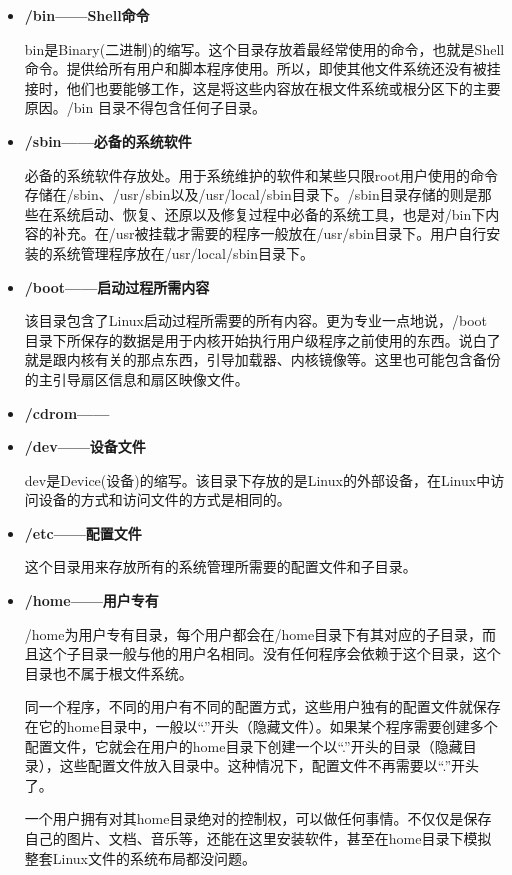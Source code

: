 \begin{itemize}
\item \textbf{/bin——Shell命令}

\qquad bin是Binary(二进制)的缩写。这个目录存放着最经常使用的命令，也就是Shell命令。提供给所有用户和脚本程序使用。所以，即使其他文件系统还没有被挂接时，他们也要能够工作，这是将这些内容放在根文件系统或根分区下的主要原因。/bin 目录不得包含任何子目录。

\item \textbf{/sbin——必备的系统软件}

\qquad 必备的系统软件存放处。用于系统维护的软件和某些只限root用户使用的命令存储在/sbin、/usr/sbin以及/usr/local/sbin目录下。/sbin目录存储的则是那些在系统启动、恢复、还原以及修复过程中必备的系统工具，也是对/bin下内容的补充。在/usr被挂载才需要的程序一般放在/usr/sbin目录下。用户自行安装的系统管理程序放在/usr/local/sbin目录下。

\item \textbf{/boot——启动过程所需内容}

\qquad 该目录包含了Linux启动过程所需要的所有内容。更为专业一点地说，/boot 目录下所保存的数据是用于内核开始执行用户级程序之前使用的东西。说白了就是跟内核有关的那点东西，引导加载器、内核镜像等。这里也可能包含备份的主引导扇区信息和扇区映像文件。

\item \textbf{/cdrom——}

\item \textbf{/dev——设备文件}

\qquad dev是Device(设备)的缩写。该目录下存放的是Linux的外部设备，在Linux中访问设备的方式和访问文件的方式是相同的。

\item \textbf{/etc——配置文件}

\qquad 这个目录用来存放所有的系统管理所需要的配置文件和子目录。

\item \textbf{/home——用户专有}

\qquad /home为用户专有目录，每个用户都会在/home目录下有其对应的子目录，而且这个子目录一般与他的用户名相同。没有任何程序会依赖于这个目录，这个目录也不属于根文件系统。

\qquad 同一个程序，不同的用户有不同的配置方式，这些用户独有的配置文件就保存在它的home目录中，一般以“.”开头（隐藏文件）。如果某个程序需要创建多个配置文件，它就会在用户的home目录下创建一个以“.”开头的目录（隐藏目录），这些配置文件放入目录中。这种情况下，配置文件不再需要以“.”开头了。

\qquad 一个用户拥有对其home目录绝对的控制权，可以做任何事情。不仅仅是保存自己的图片、文档、音乐等，还能在这里安装软件，甚至在home目录下模拟整套Linux文件的系统布局都没问题。


\end{itemize}
